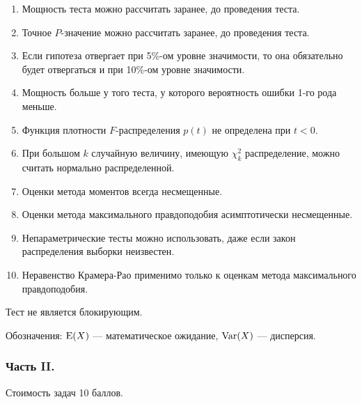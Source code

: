 \begin{enumerate}
\item Мощность теста можно рассчитать заранее, до проведения теста.
\item Точное $P$-значение можно рассчитать заранее, до проведения теста.
\item Если гипотеза отвергает при 5\%-ом уровне значимости, то
она обязательно будет отвергаться и при 10\%-ом уровне значимости.
\item Мощность больше у того теста, у которого вероятность ошибки
1-го рода меньше.
\item Функция плотности $F$-распределения $p(t)$ не определена при $t<0$.
\item При большом $k$ случайную величину, имеющую $\chi_{k}^{2}$ распределение, можно считать нормально распределенной.
\item Оценки метода моментов всегда несмещенные.
\item Оценки метода максимального правдоподобия асимптотически несмещенные.
\item Непараметрические тесты можно использовать, даже если закон распределения выборки неизвестен.
\item Неравенство Крамера-Рао применимо только к оценкам метода максимального правдоподобия.
\end{enumerate}

Тест не является блокирующим.

Обозначения: $\operatorname{E}(X)$ — математическое ожидание, $\operatorname{Var}(X)$ — дисперсия.


\subsubsection*{Часть II.}

Стоимость задач 10 баллов.

